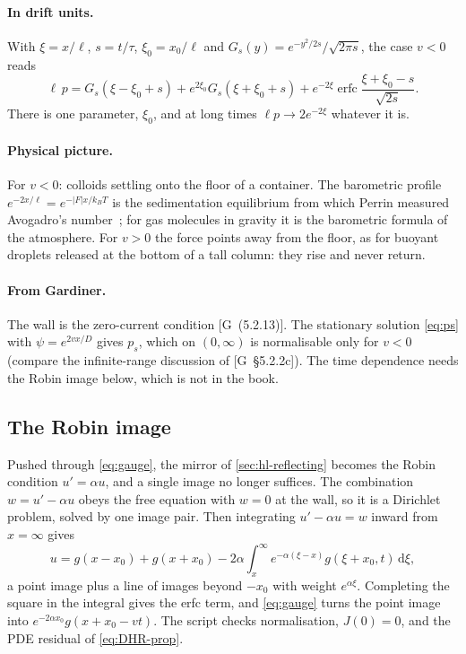 \documentclass[11pt]{article}
\numberwithin{equation}{section}
\newcommand{\dd}{\mathrm{d}}
\newcommand{\G}[1]{[G~(#1)]}
\newcommand{\Gs}[1]{[G~\S#1]}
\begin{document}
\paragraph{In drift units.} With $\xi=x/\ell$, $s=t/\tau$, $\xi_0=x_0/\ell$ and
$G_s(y)=e^{-y^2/2s}/\sqrt{2\pi s}$, the case $v<0$ reads
\begin{equation}
  \ell\,p=G_s(\xi-\xi_0+s)+e^{2\xi_0}G_s(\xi+\xi_0+s)+e^{-2\xi}\operatorname{erfc}\frac{\xi+\xi_0-s}{\sqrt{2s}} .
\end{equation}
There is one parameter, $\xi_0$, and at long times $\ell p\to2e^{-2\xi}$ whatever it is.

\paragraph{Physical picture.} For $v<0$: colloids settling onto the floor of a container. The barometric profile
$e^{-2x/\ell}=e^{-|F|x/k_BT}$ is the sedimentation equilibrium from which Perrin measured Avogadro's
number~\cite{perrin}; for gas molecules in gravity it is the barometric formula of the atmosphere. For $v>0$ the
force points away from the floor, as for buoyant droplets released at the bottom of a tall column: they rise and
never return.

\paragraph{From Gardiner.} The wall is the zero-current condition \G{5.2.13}. The stationary solution
\cref{eq:ps} with $\psi=e^{2vx/D}$ gives $p_s$, which on $(0,\infty)$ is normalisable only for $v<0$ (compare
the infinite-range discussion of \Gs{5.2.2c}). The time dependence needs the Robin image below, which is not
in the book.

\subsection{The Robin image}

Pushed through \cref{eq:gauge}, the mirror of \cref{sec:hl-reflecting} becomes the Robin condition
$u'=\alpha u$, and a single image no longer suffices. The combination
$w=u'-\alpha u$ obeys the free equation with $w=0$ at the wall, so it is a Dirichlet problem, solved by one
image pair. Then integrating $u'-\alpha u=w$ inward from $x=\infty$ gives
\begin{equation}
  u=g(x-x_0)+g(x+x_0)-2\alpha\int_x^\infty e^{-\alpha(\xi-x)}g(\xi+x_0,t)\,\dd\xi ,
\end{equation}
a point image plus a line of images beyond $-x_0$ with weight $e^{\alpha\xi}$. Completing the square in the
integral gives the erfc term, and \cref{eq:gauge} turns the point image into $e^{-2\alpha x_0}g(x+x_0-vt)$. The
script checks normalisation, $J(0)=0$, and the PDE residual of \cref{eq:DHR-prop}.
\end{document}
